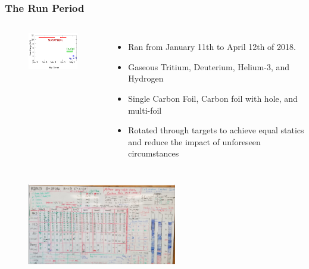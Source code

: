 \documentclass{beamer}
\begin{document}
\begin{frame}
\frametitle{The Run Period}
	\vspace{-20pt}
	\begin{columns}
		\begin{figure}
			\includegraphics[width=4.5cm]{../images/run_per}
		\end{figure}
		\vspace{-10pt}
		\begin{itemize}
			\item Ran from January 11th to April 12th of 2018.
			\item Gaseous Tritium, Deuterium, Helium-3, and Hydrogen
			\item Single Carbon Foil, Carbon foil with hole, and multi-foil
			\item Rotated through targets to achieve equal statics and reduce the impact of unforeseen circumstances
		\end{itemize}
	\end{columns}
	\begin{figure}
	\includegraphics[width=6.5cm]{../images/whiteboard_2_20}
	\end{figure}
\end{frame}
\end{document}
